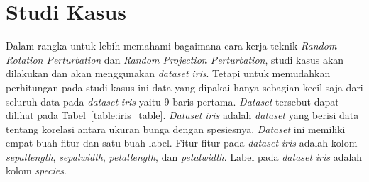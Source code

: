 \section{Studi Kasus}
\label{sec:studi-kasus}

Dalam rangka untuk lebih memahami bagaimana cara kerja teknik \textit{Random Rotation Perturbation} dan \textit{Random Projection Perturbation}, studi kasus akan dilakukan dan akan menggunakan \textit{dataset} \textit{iris}. Tetapi untuk memudahkan perhitungan pada studi kasus ini data yang dipakai hanya sebagian kecil saja dari seluruh data pada \textit{dataset} \textit{iris} yaitu 9 baris pertama. \textit{Dataset} tersebut dapat dilihat pada Tabel~\ref{table:iris_table}. \textit{Dataset} \textit{iris} adalah \textit{dataset} yang berisi data tentang korelasi antara ukuran bunga dengan spesiesnya. \textit{Dataset} ini memiliki empat buah fitur dan satu buah label. Fitur-fitur pada \textit{dataset} \textit{iris} adalah kolom \textit{sepal\textunderscore length}, \textit{sepal\textunderscore width}, \textit{petal\textunderscore length}, dan \textit{petal\textunderscore width}. Label pada \textit{dataset} \textit{iris} adalah kolom \textit{species}.

